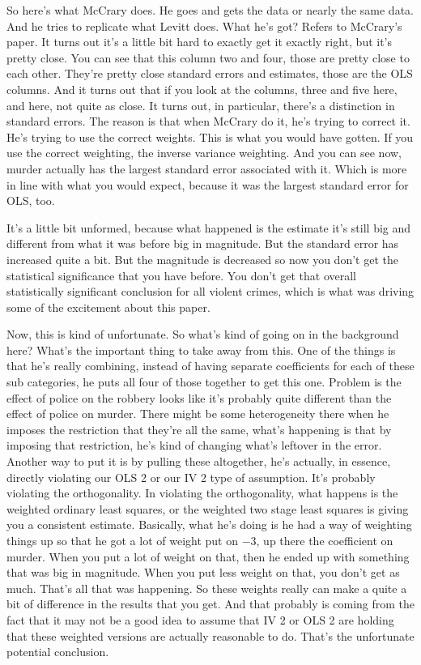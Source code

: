 \documentclass[11pt,a4paper]{amsart}
\theoremstyle{plain}
\theoremstyle{definition}
\begin{document}
				So here's what McCrary does. He goes and gets the data or nearly the same data. And he tries to replicate what Levitt does. What he's got? Refers to McCrary's paper.  It turns out it's a little bit hard to exactly get it exactly right, but it's pretty close. You can see that this column two and four, those are pretty close to each other. They're pretty close standard errors and estimates, those are the OLS columns. And it turns out that if you look at the columns, three and five here, and here, not quite as close. It turns out, in particular, there's a distinction in standard errors. The reason is that when McCrary do it,  he's trying to correct it. He's trying to use the correct weights. This is what you would have gotten. If you use the correct weighting, the inverse variance weighting. And you can see now, murder actually has the largest standard error associated with it. Which is more in line with what you would expect, because it was the largest standard error for OLS, too.\par 
				 It's a little bit unformed, because what happened is the estimate it's still big and different from what it was before big in magnitude. But the standard error has increased quite a bit.  But the magnitude is decreased so now you don't get the statistical significance that you have before. You don't get that overall statistically significant conclusion for all violent crimes, which is what was driving some of the excitement about this paper.\par 
				 Now, this is kind of unfortunate. So what's kind of going on in the background here? What's the important thing to take away from this.  One of the things is that he's really combining, instead of having separate coefficients for each of these sub categories, he puts all four of those together to get this one. Problem is the effect of police on the robbery looks like it's probably quite different than the effect of police on murder. There might be some heterogeneity there when he imposes the restriction that they're all the same, what's happening is that by imposing that restriction, he's kind of changing what's leftover in the error. Another way to put it is by pulling these altogether, he's actually, in essence, directly violating our OLS 2 or our IV 2 type of assumption. It's probably violating the orthogonality. In violating the orthogonality, what happens is the weighted ordinary least squares, or the weighted two stage least squares is giving you a consistent estimate.  Basically, what he's doing is he had a way of weighting things up so that he got a lot of weight put on $-3$, up there the coefficient on murder. When you put a lot of weight on that, then he ended up with something that was big in magnitude. When you put less weight on that, you don't get as much. That's all that was happening. So these weights really can make a quite a bit of difference in the results that you get. And that probably is coming from the fact that it may not be a good idea to assume that IV 2 or OLS 2 are holding that these weighted versions are actually reasonable to do. That's the unfortunate potential conclusion. \par 
\end{document}

